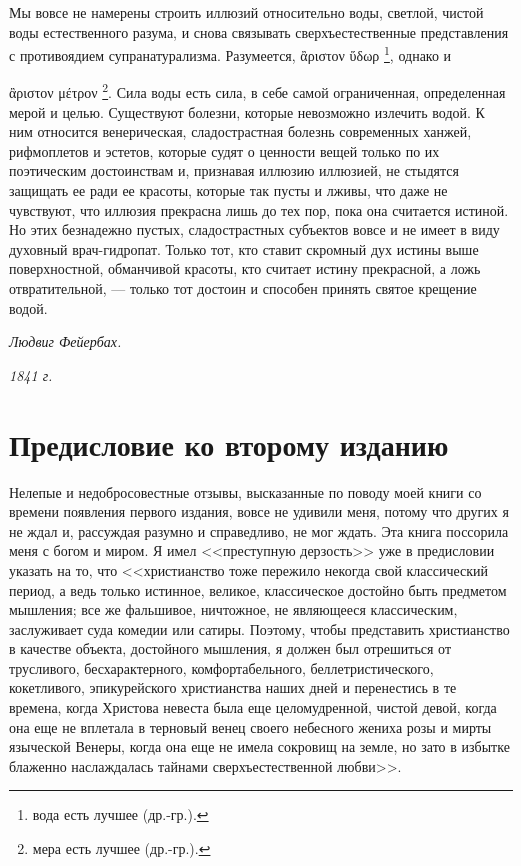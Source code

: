 \documentclass[12pt,oneside]{book}
\newcommand{\textgreek}[1]{
\begingroup\fontencoding{LGR}\selectfont#1\endgroup
}
\begin{document}
Мы вовсе не намерены строить иллюзий относительно воды, светлой, чистой воды естественного разума, и снова связывать сверхъестественные представления с противоядием супранатурализма. Разумеется, \textgreek{ἂριστον ὕδωρ}\footnote{вода есть лучшее (др.-гр.).}, однако и 
\textgreek{ἂριστον μέτρον}\footnote{мера есть лучшее (др.-гр.).}. Сила воды есть сила, в себе самой ограниченная, определенная мерой и целью. Существуют болезни, которые невозможно излечить водой. К ним относится венерическая, сладострастная болезнь современных ханжей, рифмоплетов и эстетов, которые судят о ценности вещей только по их поэтическим достоинствам и, признавая иллюзию иллюзией, не стыдятся защищать ее ради ее красоты, которые так пусты и лживы, что даже не чувствуют, что иллюзия прекрасна лишь до тех пор, пока она считается истиной. Но этих безнадежно пустых, сладострастных субъектов вовсе и не имеет в виду духовный врач-гидропат. Только тот, кто ставит скромный дух истины выше поверхностной, обманчивой красоты, кто считает истину прекрасной, а ложь отвратительной, --- только тот достоин и способен принять святое крещение водой.

\bigskip
\hfill\emph{Людвиг Фейербах.}

\hfill\emph{1841 г.}

{}
\chapter*{Предисловие ко второму изданию}

Нелепые и недобросовестные отзывы, высказанные по поводу моей книги со времени появления первого издания, вовсе не удивили меня, потому что других я не ждал и, рассуждая разумно и справедливо, не мог ждать. Эта книга поссорила меня с богом и миром. Я имел <<преступную дерзость>> уже в предисловии указать на то, что <<христианство тоже пережило некогда свой классический период, а ведь только истинное, великое, классическое достойно быть предметом мышления; все же фальшивое, ничтожное, не являющееся классическим, заслуживает суда комедии или сатиры. Поэтому, чтобы представить христианство в качестве объекта, достойного мышления, я должен был отрешиться от трусливого, бесхарактерного, комфортабельного, беллетристического, кокетливого, эпикурейского христианства наших дней и перенестись в те времена, когда Христова невеста была еще целомудренной, чистой девой, когда она еще не вплетала в терновый венец своего небесного жениха розы и мирты языческой Венеры, когда она еще не имела сокровищ на земле, но зато в избытке блаженно наслаждалась тайнами сверхъестественной любви>>.
\end{document}
